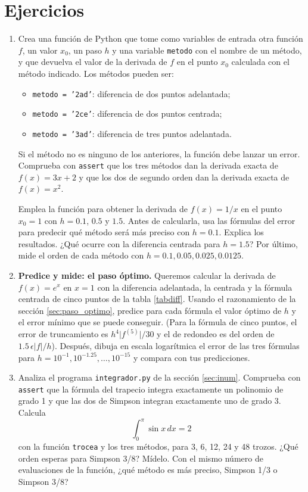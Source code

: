 \section{Ejercicios}
\begin{enumerate}
\item \label{ej:derivada} Crea una función de Python que tome como variables de entrada otra función $f$, un valor $x_0$, un paso $h$ y una variable \texttt{metodo} con el nombre de un método, y que devuelva el valor de la derivada de $f$ en el punto $x_0$ calculada con el método indicado. Los métodos pueden ser:
\begin{itemize}
\item \texttt{metodo = '2ad'}: diferencia de dos puntos adelantada;
\item \texttt{metodo = '2ce'}: diferencia de dos puntos centrada;
\item \texttt{metodo = '3ad'}: diferencia de tres puntos adelantada.
\end{itemize}
Si el método no es ninguno de los anteriores, la función debe lanzar un error. Comprueba con \texttt{assert} que los tres métodos dan la derivada exacta de $f(x)=3x+2$ y que los dos de segundo orden dan la derivada exacta de $f(x)=x^2$.

Emplea la función para obtener la derivada de $f(x) = 1/x$ en el punto $x_0 = 1$ con $h=0.1$, $0.5$ y $1.5$. Antes de calcularla, usa las fórmulas del error para predecir qué método será más preciso con $h=0.1$. Explica los resultados. ¿Qué ocurre con la diferencia centrada para $h=1.5$? Por último, mide el orden de cada método con $h=0.1, 0.05, 0.025, 0.0125$.

\item \label{ej:paso_optimo} \textbf{Predice y mide: el paso óptimo.} Queremos calcular la derivada de $f(x)=e^x$ en $x=1$ con la diferencia adelantada, la centrada y la fórmula centrada de cinco puntos de la tabla \ref{tabdiff}. Usando el razonamiento de la sección \ref{sec:paso_optimo}, predice para cada fórmula el valor óptimo de $h$ y el error mínimo que se puede conseguir. (Para la fórmula de cinco puntos, el error de truncamiento es $h^4\lvert f^{(5)}\rvert/30$ y el de redondeo es del orden de $1.5\,\epsilon\lvert f\rvert/h$). Después, dibuja en escala logarítmica el error de las tres fórmulas para $h=10^{-1},10^{-1.25},\dots,10^{-15}$ y compara con tus predicciones.

\item \label{ej:integra_funcion} Analiza el programa \texttt{integrador.py} de la sección \ref{sec:inum}. Comprueba con \texttt{assert} que la fórmula del trapecio integra exactamente un polinomio de grado 1 y que las dos de Simpson integran exactamente uno de grado 3. Calcula
\begin{equation*}
\int_0^{\pi} \sin x\,dx = 2
\end{equation*}
con la función \texttt{trocea} y los tres métodos, para 3, 6, 12, 24 y 48 trozos. ¿Qué orden esperas para Simpson 3/8? Mídelo. Con el mismo número de evaluaciones de la función, ¿qué método es más preciso, Simpson 1/3 o Simpson 3/8?


\end{enumerate}
